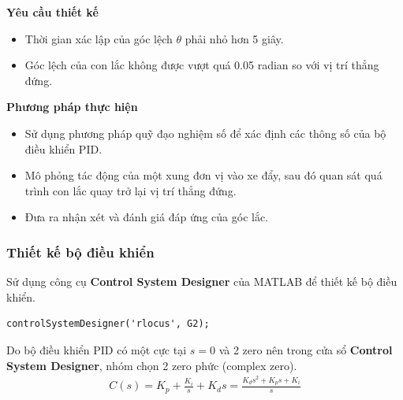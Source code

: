 \documentclass[12pt,a4paper]{article}
\begin{document}
\vspace{\baselineskip}

\begin{minipage}[t]{0.3\linewidth}
    \textbf{Yêu cầu thiết kế}
\end{minipage}\begin{minipage}[t]{0.6\linewidth}
    \begin{itemize}[noitemsep,topsep=0pt]
        \item Thời gian xác lập của góc lệch $\theta$ phải nhỏ hơn 5 giây.
        \item Góc lệch của con lắc không được vượt quá 0.05 radian so với vị trí thẳng đứng.
    \end{itemize}
\end{minipage}

\vspace{\baselineskip}

\begin{minipage}[t]{0.3\linewidth}
    \textbf{Phương pháp thực hiện}
\end{minipage}\begin{minipage}[t]{0.6\linewidth}
    \begin{itemize}[noitemsep,topsep=0pt]
        \item Sử dụng phương pháp quỹ đạo nghiệm số để xác định các thông số của bộ điều khiển PID.
        \item Mô phỏng tác động của một xung đơn vị vào xe đẩy, sau đó quan sát quá trình con lắc quay trở lại vị trí thẳng đứng.
        \item Đưa ra nhận xét và đánh giá đáp ứng của góc lắc.
    \end{itemize}
\end{minipage}

\subsubsection{Thiết kế bộ điều khiển}

Sử dụng công cụ \textbf{Control System Designer} của MATLAB để thiết kế bộ điều khiển. 
\begin{lstlisting}[style=matlabstyle,caption=Thiết kế bộ điều khiển PID cho hàm truyền $G_2(s)$]
controlSystemDesigner('rlocus', G2);
\end{lstlisting}

Do bộ điều khiển PID có một cực tại $s=0$ và 2 zero nên trong cửa sổ \textbf{Control System Designer}, nhóm chọn 2 zero phức (complex zero). 
\begin{align}
    C(s) = K_p + \frac{K_i}{s} + K_ds = \frac{K_ds^2 + K_ps +K_i}{s}
\end{align}
\end{document}

